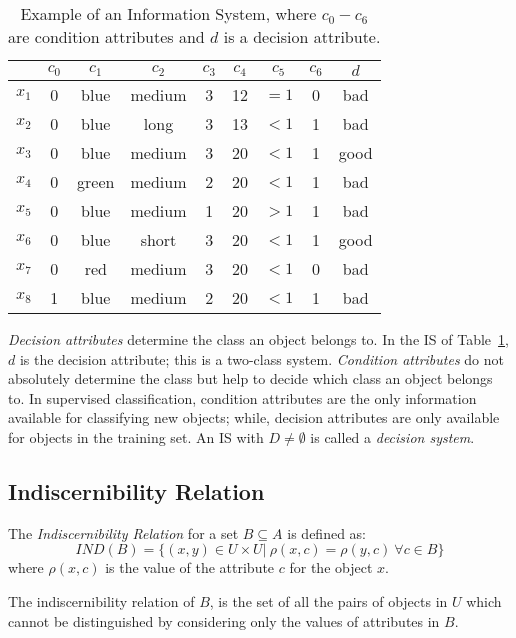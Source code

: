 \documentclass[authoryear,preprint,review,12pt]{elsarticle}
\begin{document}
 \begin{table}[htb]
		\caption{Example of an Information System, where $c_0-c_6$ are condition attributes and $d$ is a decision attribute.} \label{tab_IS}
		\centering
 	\begin{tabular}{c||c|c|c|c|c|c|c||c}
 			  & $c_0$ & $c_1$ & $c_2$ &  $c_3$ & $c_4$ & $c_5$ &  $c_6$ & $d$ \\
 		\hline \hline
		$x_1$ & 0 & blue  & medium & 3 & 12 & $=1$  & 0 & bad   \\
		$x_2$ & 0 & blue  & long   & 3 & 13 & $<1$  & 1 & bad   \\
		$x_3$ & 0 & blue  & medium & 3 & 20 & $<1$  & 1 & good   \\
		$x_4$ & 0 & green & medium & 2 & 20 & $<1$  & 1 & bad   \\
		$x_5$ & 0 & blue  & medium & 1 & 20 & $>1$  & 1 & bad   \\
		$x_6$ & 0 & blue  & short  & 3 & 20 & $<1$  & 1 & good   \\
		$x_7$ & 0 & red   & medium & 3 & 20 & $<1$  & 0 & bad   \\
		$x_8$ & 1 & blue  & medium & 2 & 20 & $<1$  & 1 & bad   \\
 	\end{tabular}             
 \end{table}
 
  \textit{Decision attributes} determine the class an object belongs to. In the IS of Table~\ref{tab_IS}, $d$ is the decision attribute; this is a two-class system. \textit{Condition attributes} do not absolutely determine the class but help to decide which class an object belongs to. In supervised classification, condition attributes are the only information available for classifying new objects; while, decision attributes are only available for objects in the training set. An IS with $D \neq \emptyset$ is called a \textit{decision system}.
  
\subsection{Indiscernibility Relation}\label{subsect_Pos}
  The \textit{Indiscernibility Relation} for a set $B \subseteq A$ is defined as:
  $$IND(B) = \lbrace (x,y)\in U\times U|~\rho(x,c)=\rho(y,c)~\forall c \in B \rbrace $$
  where $\rho(x,c)$ is the value of the attribute $c$ for the object $x$.
  
  The indiscernibility relation of $B$, is the set of all the pairs of objects in $U$ which cannot be distinguished by considering only the values of attributes in $B$.
 
\end{document}
